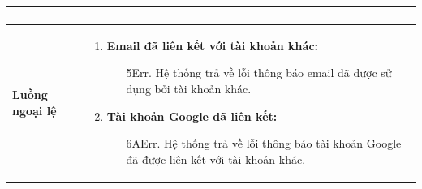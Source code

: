 {\begin{tabularx}{\textwidth}{|>{\raggedright\arraybackslash}p{3.5cm}|>{\raggedright\arraybackslash}X|}
\begin{enumerate}
\end{enumerate} \\
\hline
\textbf{Luồng ngoại lệ} &
\begin{enumerate}
    \item \textbf{Email đã liên kết với tài khoản khác:}
    \begin{enumerate}
        \item[5Err.] Hệ thống trả về lỗi thông báo email đã được sử dụng bởi tài khoản khác.
    \end{enumerate}
    \item \textbf{Tài khoản Google đã liên kết:}
    \begin{enumerate}
        \item[6AErr.] Hệ thống trả về lỗi thông báo tài khoản Google đã được liên kết với tài khoản khác.
    \end{enumerate}
\end{enumerate} \\
\hline
\end{tabularx}
}
